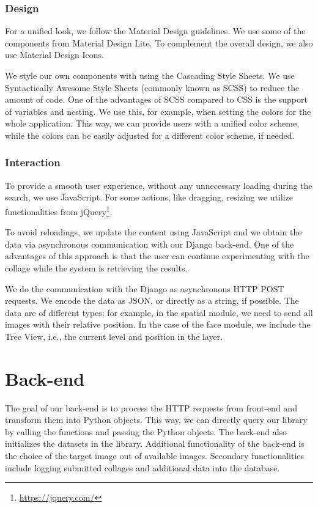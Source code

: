 \subsubsection*{Design}
For a unified look, we follow the Material Design guidelines. We use some of the components from Material Design Lite. To complement the overall design, we also use Material Design Icons.

We style our own components with using the Cascading Style Sheets. We use Syntactically Awesome Style Sheets (commonly known as SCSS) to reduce the amount of code. One of the advantages of SCSS compared to CSS is the support of variables and nesting. We use this, for example, when setting the colors for the whole application. This way, we can provide users with a unified color scheme, while the colors can be easily adjusted for a different color scheme, if needed.

\subsubsection*{Interaction}

To provide a smooth user experience, without any unnecessary loading during the search, we use JavaScript. For some actions, like dragging, resizing we utilize functionalities from jQuery\footnote{\url{https://jquery.com/}}. 

To avoid reloadings, we update the content using JavaScript and we obtain the data via asynchronous communication with our Django back-end. One of the advantages of this approach is that the user can continue experimenting with the collage while the system is retrieving the results.

We do the communication with the Django as asynchronous HTTP POST requests. We encode the data as JSON, or directly as a string, if possible. The data are of different types; for example, in the spatial module, we need to send all images with their relative position. In the case of the face module, we include the Tree View, i.e., the current level and position in the layer.

\section{Back-end}

The goal of our back-end is to process the HTTP requests from front-end and transform them into Python objects. This way, we can directly query our library by calling the functions and passing the Python objects. The back-end also initializes the datasets in the library. Additional functionality of the back-end is the choice of the target image out of available images. Secondary functionalities include logging submitted collages and additional data into the database.

